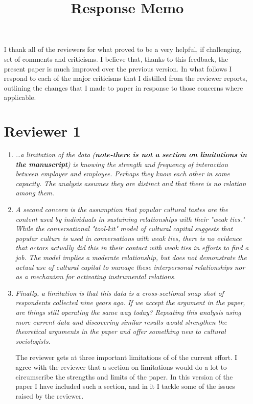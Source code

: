 \documentclass[11pt]{article}
\title{Response Memo}
\begin{document}
\maketitle

I thank all of the reviewers for what proved to be a very helpful, if challenging, set of comments and criticisms.  I believe that, thanks to this feedback, the present paper is much improved over the previous version.  In  what follows I respond to each of the major criticisms that I distilled from the reviewer reports, outlining the changes that I made to paper in response to those concerns where applicable.

\section{Reviewer 1}
\begin{enumerate}
	\item \emph{ {\ldots}a limitation of the data (\textbf{note-there is not a section on limitations in the manuscript}) is knowing the strength and frequency of interaction between employer and employee. Perhaps they know each other in some capacity. The analysis assumes they are distinct and that there is no relation among them.}
	\item \emph{A second concern is the assumption that popular cultural tastes are the content used by individuals in sustaining relationships with their "weak ties." While the conversational "tool-kit" model of cultural capital suggests that popular culture is used in conversations with weak ties, there is no evidence that actors actually did this in their contact with weak ties in efforts to find a job.  The model implies a moderate relationship, but does not demonstrate the actual use of cultural capital to manage these interpersonal relationships nor as a mechanism for activating instrumental relations.} 
	\item \emph{Finally, a limitation is that this data is a cross-sectional snap shot of respondents collected nine years ago. If we accept the argument in the paper, are things still operating the same way today? Repeating this analysis using more current data and discovering similar results would strengthen the theoretical arguments in the paper and offer something new to cultural sociologists. }
	
The reviewer gets at three important limitations of of the current effort. I agree with the reviewer that a section on limitations would do a lot to circumscribe the strengths and limits of the paper.  In this version of the paper I have included such a section, and in it I tackle some of the issues raised by the reviewer.   


\end{enumerate}
\end{document}
